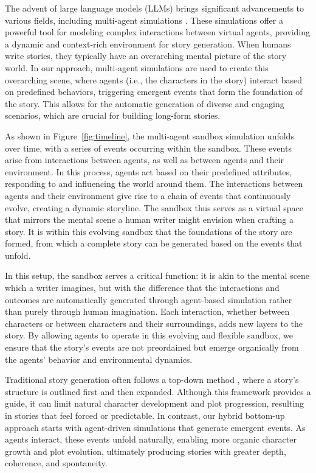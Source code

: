\documentclass[letterpaper]{article} %
\begin{document}
The advent of large language models (LLMs) brings significant advancements to various fields, including multi-agent simulations \cite{li-etal-2024-econagent, qian-etal-2024-experiential, chen-etal-2024-llmarena}. These simulations offer a powerful tool for modeling complex interactions between virtual agents, providing a dynamic and context-rich environment for story generation. When humans write stories, they typically have an overarching mental picture of the story world. In our approach, multi-agent simulations are used to create this overarching scene, where agents (i.e., the characters in the story) interact based on predefined behaviors, triggering emergent events that form the foundation of the story. This allows for the automatic generation of diverse and engaging scenarios, which are crucial for building long-form stories.

As shown in Figure~\ref{fig:timeline}, the multi-agent sandbox simulation unfolds over time, with a series of events occurring within the sandbox. These events arise from interactions between agents, as well as between agents and their environment. In this process, agents act based on their predefined attributes, responding to and influencing the world around them. The interactions between agents and their environment give rise to a chain of events that continuously evolve, creating a dynamic storyline. The sandbox thus serves as a virtual space that mirrors the mental scene a human writer might envision when crafting a story. It is within this evolving sandbox that the foundations of the story are formed, from which a complete story can be generated based on the events that unfold.

In this setup, the sandbox serves a critical function: it is akin to the mental scene which a writer imagines, but with the difference that the interactions and outcomes are automatically generated through agent-based simulation rather than purely through human imagination. Each interaction, whether between characters or between characters and their surroundings, adds new layers to the story. By allowing agents to operate in this evolving and flexible sandbox, we ensure that the story's events are not preordained but emerge organically from the agents' behavior and environmental dynamics.

Traditional story generation often follows a top-down method \cite{zhou2023recurrentgpt, wang-etal-2023-improving-pacing, fan-etal-2019-strategies, goldfarb-tarrant-etal-2020-content, yang-etal-2022-re3}, where a story's structure is outlined first and then expanded. Although this framework provides a guide, it can limit natural character development and plot progression, resulting in stories that feel forced or predictable. In contrast, our hybrid bottom-up approach starts with agent-driven simulations that generate emergent events. As agents interact, these events unfold naturally, enabling more organic character growth and plot evolution, ultimately producing stories with greater depth, coherence, and spontaneity.
\end{document}
